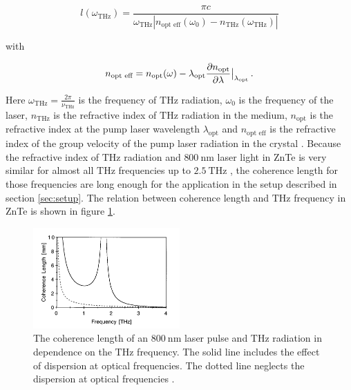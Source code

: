 \begin{equation}
    l(\omega_{\si{\tera\hertz}}) = \frac{\pi c}{\omega_{\si{\tera\hertz}} \left | n_\text{opt eff}(\omega_0) - n_{\si{\tera\hertz}}(\omega_{\si{\tera\hertz}})\right |}
\end{equation}

with 

\begin{equation}
    n_{\text{opt eff}} = n_\text{opt}(\omega) - \lambda_\text{opt}\frac{\partial n_\text{opt}}{\partial \lambda}\big{|}_{\lambda_\text{opt}} \, .  
\end{equation}

Here $\omega_{\si{\tera\hertz}} = \frac{2\pi}{\nu_{\si{\tera\hertz}}}$ is the frequency of $\si{\tera\hertz}$ radiation, $\omega_0$ is the frequency of the laser, $n_{\si{\tera\hertz}}$ is the refractive index of $\si{\tera\hertz}$ radiation in the medium, $n_\text{opt}$ is the refractive index at the pump laser wavelength $\lambda_\text{opt}$ and $n_\text{opt eff}$ is the refractive index of the group velocity of the pump laser radiation in the crystal \cite{coherence_legnth}.
Because the refractive index of $\si{\tera\hertz}$ radiation and $\SI{800}{\nano\meter}$ laser light in ZnTe is very similar for almost all $\si{\tera\hertz}$ frequencies up to $\SI{2.5}{\tera\hertz}$ \cite{coherence_legnth}, the coherence length for those frequencies are long enough for the application in the setup described in section \ref{sec:setup}.
The relation between coherence length and $\si{\tera\hertz}$ frequency in ZnTe is shown in figure \ref{fig:coherence_legnth}.

\begin{figure}
    \centering
    \includegraphics[width=0.5\textwidth]{refferenced_pic/coherence_length_ZnTe.png}
    \caption{The coherence length of an $\SI{800}{\nano\meter}$ laser pulse and $\si{\tera\hertz}$ radiation in dependence on the $\si{\tera\hertz}$ frequency.
    The solid line includes the effect of dispersion at optical frequencies. The dotted line neglects the dispersion at optical frequencies \cite{coherence_legnth}.}
    \label{fig:coherence_legnth}
\end{figure}
\FloatBarrier
